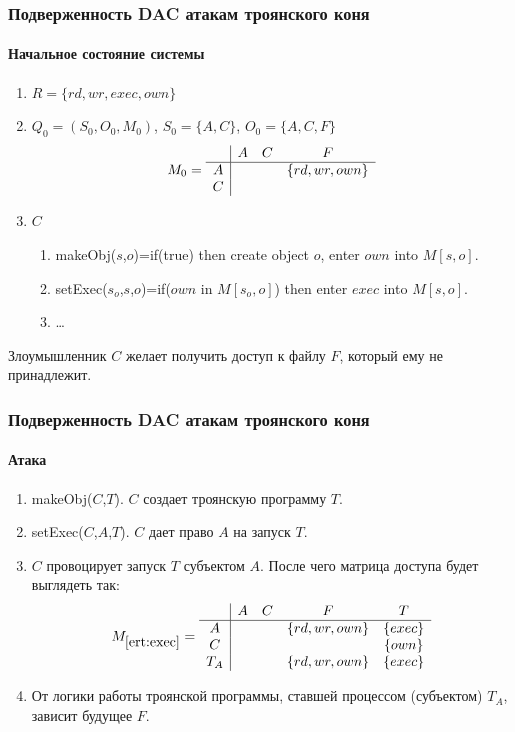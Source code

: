 \begin{frame}
    \frametitle{Подверженность DAC атакам троянского коня}
    \framesubtitle{Начальное состояние системы}
    
    \begin{enumerate}
        \item $R=\{rd,wr,exec,own\}$
        \item $Q_0=(S_0, O_0, M_0)$, $S_0=\{A,C\}$, $O_0=\{A,C,F\}$
        \[
            M_0=
            \begin{array}[c]{c|ccc}
                    & A     &  C    &  F            \\ \hline
                A   &       &       &  \{rd,wr,own\}\\ 
                C   &       &       &               \\ 
            \end{array}
        \]
        \item $C$
        \begin{enumerate}
            \item makeObj($s$,$o$)=if(true) then create object $o$, enter $own$ into $M[s,o]$.
            \item setExec($s_o$,$s$,$o$)=if($own$ in $M[s_o,o]$) then enter $exec$ into $M[s,o]$.
            \item\ldots
        \end{enumerate}
    \end{enumerate}
    Злоумышленник $C$ желает получить доступ к файлу $F$, который ему не принадлежит.
\end{frame}


\begin{frame}
    \frametitle{Подверженность DAC атакам троянского коня}
    \framesubtitle{Атака}
    
    \begin{enumerate}
        \item makeObj($C$,$T$). $C$ создает троянскую программу $T$.
        \item setExec($C$,$A$,$T$). $C$ дает право $A$ на запуск $T$.
        \item \label{ert:exec}$C$ провоцирует запуск $T$ субъектом $A$.
            После чего матрица доступа будет выглядеть так:
        \[
            M_{\ref{ert:exec}}=
            \begin{array}[c]{c|cccc}
                      & A   & C & F             & T       \\ \hline
                A     &     &   & \{rd,wr,own\} & \{exec\}    \\ 
                C     &     &   &               & \{own\}     \\ 
                T_A   &     &   & \{rd,wr,own\} & \{exec\}    
            \end{array}
        \]        
        \item От логики работы троянской программы, ставшей процессом (субъектом) $T_A$, зависит будущее $F$.
    \end{enumerate}
\end{frame}


